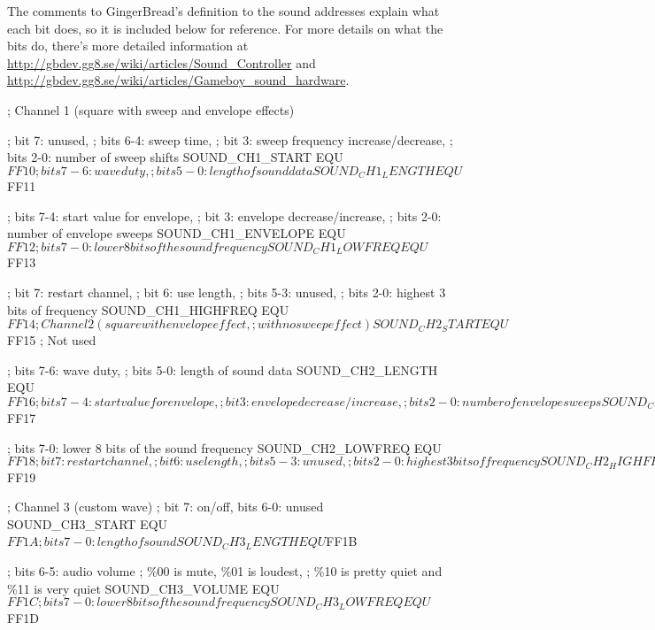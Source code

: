 \documentclass[11pt]{book}
\begin{document}
The comments to GingerBread’s definition to the sound addresses explain what each bit does, so it is included below for reference. For more details on what the bits do, there’s more detailed information at \url{http://gbdev.gg8.se/wiki/articles/Sound_Controller} and \url{http://gbdev.gg8.se/wiki/articles/Gameboy_sound_hardware}. 

\begin{code}
; Channel 1 (square with sweep and envelope effects)

; bit 7: unused, 
; bits 6-4: sweep time,
; bit 3: sweep frequency increase/decrease, 
; bits 2-0: number of sweep shifts
SOUND_CH1_START     EQU $FF10 

; bits 7-6: wave duty, 
; bits 5-0: length of sound data
SOUND_CH1_LENGTH    EQU $FF11 

; bits 7-4: start value for envelope, 
; bit 3: envelope decrease/increase, 
; bits 2-0: number of envelope sweeps
SOUND_CH1_ENVELOPE  EQU $FF12 

; bits 7-0: lower 8 bits of the sound frequency
SOUND_CH1_LOWFREQ   EQU $FF13

; bit 7: restart channel, 
; bit 6: use length, 
; bits 5-3: unused,
; bits 2-0: highest 3 bits of frequency 
SOUND_CH1_HIGHFREQ  EQU $FF14 

; Channel 2 (square with envelope effect,
; with no sweep effect)
SOUND_CH2_START     EQU $FF15 ; Not used 

; bits 7-6: wave duty,
; bits 5-0: length of sound data
SOUND_CH2_LENGTH    EQU $FF16 

; bits 7-4: start value for envelope,
; bit 3: envelope decrease/increase,
; bits 2-0: number of envelope sweeps
SOUND_CH2_ENVELOPE  EQU $FF17 

; bits 7-0: lower 8 bits of the sound frequency
SOUND_CH2_LOWFREQ   EQU $FF18 

; bit 7: restart channel,
; bit 6: use length,
; bits 5-3: unused,
; bits 2-0: highest 3 bits of frequency
SOUND_CH2_HIGHFREQ  EQU $FF19 

; Channel 3 (custom wave)
; bit 7: on/off, bits 6-0: unused
SOUND_CH3_START     EQU $FF1A
 
; bits 7-0: length of sound
SOUND_CH3_LENGTH    EQU $FF1B
 
; bits 6-5: audio volume 
; \%00 is mute, \%01 is loudest,
; \%10 is pretty quiet and \%11 is very quiet
SOUND_CH3_VOLUME    EQU $FF1C 

; bits 7-0: lower 8 bits of the sound frequency
SOUND_CH3_LOWFREQ   EQU $FF1D 


\end{code}
\end{document}
